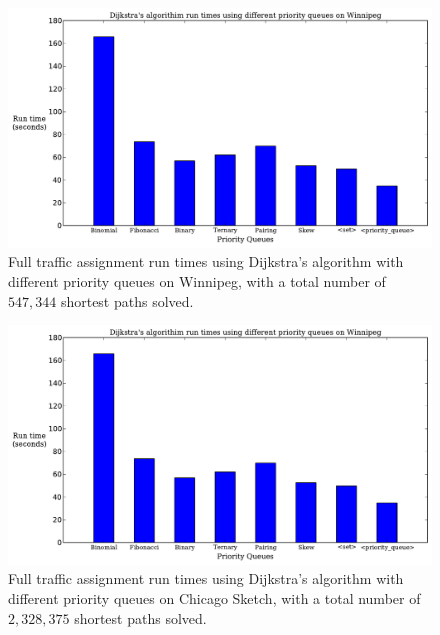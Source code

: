 
\begin{figure}[H]
    \centering
    \includegraphics[page=1, width=\textwidth, height=.4\textheight]{img/pq_runtime}
    \caption{Full traffic assignment run times using Dijkstra's algorithm with different priority queues on Winnipeg, with a total number of $547{,}344$ shortest paths solved.}
    \label{fig:pq_runtime2}
\end{figure}
\begin{figure}[H]
    \centering
    \includegraphics[page=2, width=\textwidth, height=.4\textheight]{img/pq_runtime}
    \caption{Full traffic assignment run times using Dijkstra's algorithm with different priority queues on Chicago Sketch, with a total number of $2{,}328{,}375$ shortest paths solved.}
    \label{fig:pq_runtime}
\end{figure}

